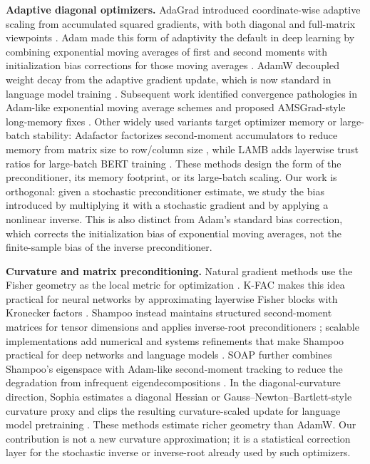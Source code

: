 \documentclass{article}
\begin{document}
\textbf{Adaptive diagonal optimizers.}
AdaGrad introduced coordinate-wise adaptive scaling from accumulated squared gradients, with both diagonal and full-matrix viewpoints \citep{duchi2011adaptive}. Adam made this form of adaptivity the default in deep learning by combining exponential moving averages of first and second moments with initialization bias corrections for those moving averages \citep{kingma2015adam}. AdamW decoupled weight decay from the adaptive gradient update, which is now standard in language model training \citep{loshchilov2019decoupled}. Subsequent work identified convergence pathologies in Adam-like exponential moving average schemes and proposed AMSGrad-style long-memory fixes \citep{reddi2018convergence}. Other widely used variants target optimizer memory or large-batch stability: Adafactor factorizes second-moment accumulators to reduce memory from matrix size to row/column size \citep{shazeer2018adafactor}, while LAMB adds layerwise trust ratios for large-batch BERT training \citep{you2020large}. These methods design the form of the preconditioner, its memory footprint, or its large-batch scaling. Our work is orthogonal: given a stochastic preconditioner estimate, we study the bias introduced by multiplying it with a stochastic gradient and by applying a nonlinear inverse. This is also distinct from Adam's standard bias correction, which corrects the initialization bias of exponential moving averages, not the finite-sample bias of the inverse preconditioner.

\textbf{Curvature and matrix preconditioning.}
Natural gradient methods use the Fisher geometry as the local metric for optimization \citep{amari1998natural}. K-FAC makes this idea practical for neural networks by approximating layerwise Fisher blocks with Kronecker factors \citep{martens2015optimizing}. Shampoo instead maintains structured second-moment matrices for tensor dimensions and applies inverse-root preconditioners \citep{gupta2018shampoo}; scalable implementations add numerical and systems refinements that make Shampoo practical for deep networks and language models \citep{anil2021scalable}. SOAP further combines Shampoo's eigenspace with Adam-like second-moment tracking to reduce the degradation from infrequent eigendecompositions \citep{vyas2024soap}. In the diagonal-curvature direction, Sophia estimates a diagonal Hessian or Gauss--Newton--Bartlett-style curvature proxy and clips the resulting curvature-scaled update for language model pretraining \citep{liu2024sophia}. These methods estimate richer geometry than AdamW. Our contribution is not a new curvature approximation; it is a statistical correction layer for the stochastic inverse or inverse-root already used by such optimizers.
\end{document}
